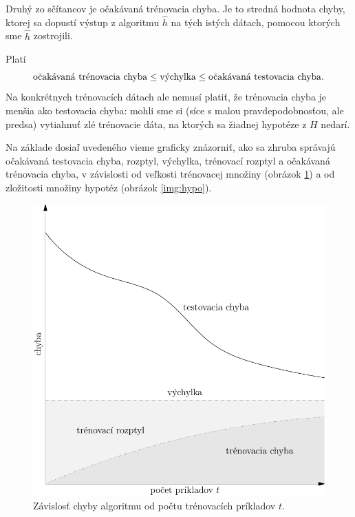 \medskip

Druhý zo sčítancov je očakávaná trénovacia chyba. Je to stredná hodnota
chyby, ktorej sa dopustí výstup z algoritmu $\hat{h}$ na tých istých
dátach, pomocou ktorých sme $\hat{h}$ zostrojili.

\medskip

Platí
$$ \chalgt \leq \vychylka \leq \chalg. $$
Na konkrétnych trénovacích dátach ale nemusí platiť, že trénovacia
chyba je menšia ako testovacia chyba: mohli sme si (síce s malou
pravdepodobnosťou, ale predsa) vytiahnuť zlé trénovacie dáta, na
ktorých sa žiadnej hypotéze z $H$ nedarí.

\medskip

Na základe dosiaľ uvedeného vieme graficky znázorniť, ako sa zhruba správajú
očakávaná testovacia chyba, rozptyl, výchylka, trénovací rozptyl a očakávaná
trénovacia chyba, v závislosti od veľkosti trénovacej množiny (obrázok 
\ref{img:train}) a od zložitosti množiny hypotéz (obrázok 
\ref{img:hypo}).

\begin{figure}
  \centering
  \includegraphics[scale=0.8]{obrazky/krivky1.pdf}
  \caption{Závislosť chyby algoritmu od počtu trénovacích príkladov $t$.}
  \label{img:train}
\end{figure}

